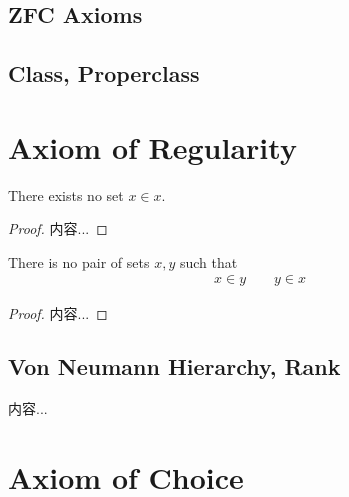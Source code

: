\documentclass[Total.tex]{subfiles}
\begin{document}
			\subsection{ZFC Axioms}
			
			
			\subsection{Class, Properclass}
		\section{Axiom of Regularity}
			\begin{proposition}
				There exists no set $x\in x$. 
			\end{proposition}
			\begin{proof}
				内容...
			\end{proof}
			
			\begin{corollary}
				There is no pair of sets $x,y$ such that
				\begin{gather*}
					x\in y\qquad y\in x
				\end{gather*}
			\end{corollary}
			\begin{proof}
				内容...
			\end{proof}
			
			\subsection{Von Neumann Hierarchy, Rank}
				\begin{Def}
					内容...
				\end{Def}
		\section{Axiom of Choice}
			
\end{document}
